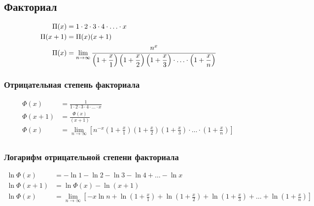 \subsection{Факториал}

\begin{equation*}
\begin{aligned}
\Pi(x) &= 1 \cdot 2 \cdot 3 \cdot 4 \cdot \ldots \cdot x
\\
\Pi(x + 1) &= \Pi(x) (x + 1)
\\
\Pi(x) &= \lim_{n \to \infty}
{
\cfrac{n^x}
{
\left(1 + \displaystyle \frac{x}{1} \right) 
\left(1 + \displaystyle \frac{x}{2} \right)
\left(1 + \displaystyle \frac{x}{3} \right) 
\cdot \ldots \cdot 
\left(1 + \displaystyle \frac{x}{n} \right)
}
} \\
\end{aligned}
\end{equation*}

\subsubsection{Отрицательная степень факториала}

\begin{equation*}
\begin{aligned}
\Phi(x) &= \frac{1}{1 \cdot 2 \cdot 3 \cdot 4 \cdot \ldots \cdot x} \\
\Phi(x + 1) &= \frac{\Phi(x)}{(x + 1)} \\
\Phi(x) &= \lim_{n \to \infty} \left[
n^{-x}
\left(1 + \displaystyle \frac{x}{1} \right) 
\left(1 + \displaystyle \frac{x}{2} \right)
\left(1 + \displaystyle \frac{x}{3} \right) 
\cdot \ldots \cdot 
\left(1 + \displaystyle \frac{x}{n} \right) \right] \\
\end{aligned}
\end{equation*}

\subsubsection{Логарифм отрицательной степени факториала}

\begin{equation*}
\begin{aligned}
\ln{\Phi(x)} &= - \ln{1} - \ln{2} - \ln{3} - \ln{4} + \ldots - \ln{x} \\
\ln{\Phi(x + 1)} &= \ln{\Phi(x)} - \ln{(x + 1)} \\
\ln{\Phi(x)} &= \lim_{n \to \infty}
{\left[
- x \ln{n}
+ \ln{\left(1 + \frac{x}{1} \right)} 
+ \ln{\left(1 + \frac{x}{2} \right)}
+ \ln{\left(1 + \frac{x}{3} \right)}
+ \ldots
+ \ln{\left(1 + \frac{x}{n} \right)}
\right]} \\
\end{aligned}
\end{equation*}

